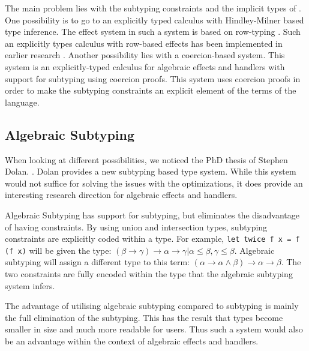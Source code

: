 The main problem lies with the subtyping constraints and the implicit types of \eff. One possibility is to go to an explicitly typed calculus with Hindley-Milner based type inference. The effect system in such a system is based on row-typing \cite{type-directed, row, leijen2014koka}. Such an explicitly types calculus with row-based effects has been implemented in earlier research \cite{row-optimised}.  
Another possibility lies with a coercion-based system. This system is an explicitly-typed calculus for algebraic effects and handlers with support for subtyping using coercion proofs. This system uses coercion proofs in order to make the subtyping constraints an explicit element of the terms of the language. \cite{saleh2018explicit}

\subsection{Algebraic Subtyping}

When looking at different possibilities, we noticed the PhD thesis of Stephen Dolan. \cite{dolan2017algebraic}. Dolan provides a new subtyping based type system. While this system would not suffice for solving the issues with the optimizations, it does provide an interesting research direction for algebraic effects and handlers. 

Algebraic Subtyping has support for subtyping, but eliminates the disadvantage of having constraints. By using union and intersection types, subtyping constraints are explicitly coded within a type. For example, \lstinline{let twice f x = f (f x)} will be given the type: $(\beta \to \gamma) \to \alpha \to \gamma | \alpha \le \beta, \gamma \le \beta$. Algebraic subtyping will assign a different type to this term: $(\alpha \to \alpha \land \beta) \to \alpha \to \beta$. The two constraints are fully encoded within the type that the algebraic subtyping system infers. 

The advantage of utilising algebraic subtyping compared to subtyping is mainly the full elimination of the subtyping. This has the result that types become smaller in size and much more readable for users. Thus such a system would also be an advantage within the context of algebraic effects and handlers. 